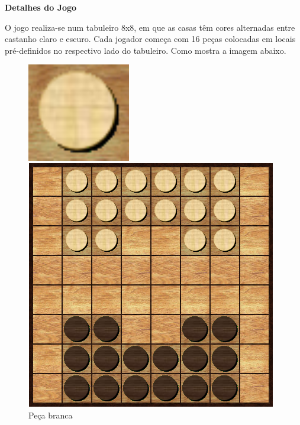 \documentclass[a4paper]{article}
\begin{document}
\large{\textbf{Detalhes do Jogo}}
\begin{small}

O jogo realiza-se num tabuleiro 8x8, em que as casas têm cores alternadas entre castanho claro e escuro. Cada jogador começa com 16 peças colocadas em locais pré-definidos no respectivo lado do tabuleiro. Como mostra a imagem abaixo.\newline

\begin{figure}[h!]
  \begin{minipage}[h!]{0.2\textwidth}
    \includegraphics[width=0.4\textwidth]{res/white_piece.png}
    \centering
    \caption{Peça branca}
    \label{fig:2}
  \end{minipage}
	\quad\quad\quad
  \begin{minipage}[h!]{0.2\textwidth}
    \includegraphics[width=\textwidth]{res/board.png}

\end{minipage}
\end{figure}
\end{small}
\end{document}
